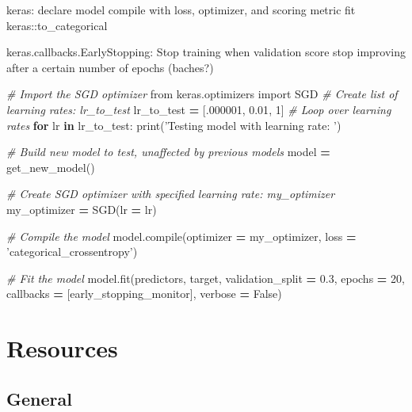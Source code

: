 \documentclass[]{book}
\newenvironment{Shaded}{\begin{snugshade}}{\end{snugshade}}
\newcommand{\KeywordTok}[1]{\textcolor[rgb]{0.13,0.29,0.53}{\textbf{#1}}}
\newcommand{\DecValTok}[1]{\textcolor[rgb]{0.00,0.00,0.81}{#1}}
\newcommand{\FloatTok}[1]{\textcolor[rgb]{0.00,0.00,0.81}{#1}}
\newcommand{\StringTok}[1]{\textcolor[rgb]{0.31,0.60,0.02}{#1}}
\newcommand{\ImportTok}[1]{#1}
\newcommand{\CommentTok}[1]{\textcolor[rgb]{0.56,0.35,0.01}{\textit{#1}}}
\newcommand{\VariableTok}[1]{\textcolor[rgb]{0.00,0.00,0.00}{#1}}
\newcommand{\ControlFlowTok}[1]{\textcolor[rgb]{0.13,0.29,0.53}{\textbf{#1}}}
\newcommand{\OperatorTok}[1]{\textcolor[rgb]{0.81,0.36,0.00}{\textbf{#1}}}
\newcommand{\BuiltInTok}[1]{#1}
\newcommand{\NormalTok}[1]{#1}
\begin{document}
keras: declare model \textbar{} compile with loss, optimizer, and
scoring metric \textbar{} fit \textbar{} keras::to\_categorical

keras.callbacks.EarlyStopping: Stop training when validation score stop
improving after a certain number of epochs (baches?)

\begin{Shaded}
\begin{Highlighting}[]
\CommentTok{# Import the SGD optimizer}
\ImportTok{from}\NormalTok{ keras.optimizers }\ImportTok{import}\NormalTok{ SGD}
\CommentTok{# Create list of learning rates: lr_to_test}
\NormalTok{lr_to_test }\OperatorTok{=}\NormalTok{ [.}\DecValTok{000001}\NormalTok{, }\FloatTok{0.01}\NormalTok{, }\DecValTok{1}\NormalTok{]}
\CommentTok{# Loop over learning rates}
\ControlFlowTok{for}\NormalTok{ lr }\KeywordTok{in}\NormalTok{ lr_to_test:}
    \BuiltInTok{print}\NormalTok{(}\StringTok{'Testing model with learning rate: '}\NormalTok{)}
    
    \CommentTok{# Build new model to test, unaffected by previous models}
\NormalTok{    model }\OperatorTok{=}\NormalTok{ get_new_model()}
    
    \CommentTok{# Create SGD optimizer with specified learning rate: my_optimizer}
\NormalTok{    my_optimizer }\OperatorTok{=}\NormalTok{ SGD(lr }\OperatorTok{=}\NormalTok{ lr)}
    
    \CommentTok{# Compile the model}
\NormalTok{    model.}\BuiltInTok{compile}\NormalTok{(optimizer }\OperatorTok{=}\NormalTok{ my_optimizer, loss }\OperatorTok{=} \StringTok{'categorical_crossentropy'}\NormalTok{)}
    
    \CommentTok{# Fit the model}
\NormalTok{    model.fit(predictors, }
\NormalTok{              target, }
\NormalTok{              validation_split }\OperatorTok{=} \FloatTok{0.3}\NormalTok{, }
\NormalTok{              epochs }\OperatorTok{=} \DecValTok{20}\NormalTok{, }
\NormalTok{              callbacks }\OperatorTok{=}\NormalTok{ [early_stopping_monitor], }
\NormalTok{              verbose }\OperatorTok{=} \VariableTok{False}\NormalTok{)}
\end{Highlighting}
\end{Shaded}

\chapter{Resources}\label{resources}

\section{General}\label{general-6}
\end{document}
